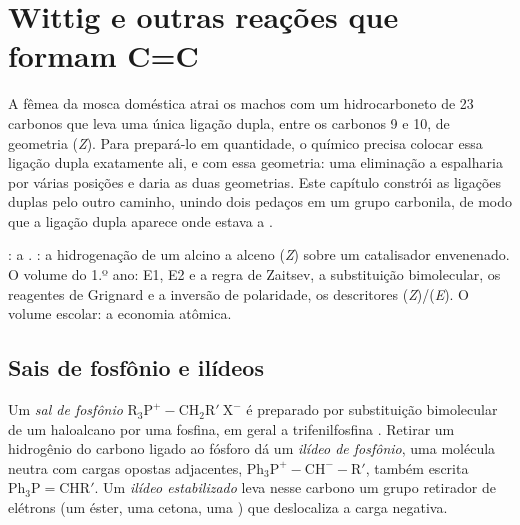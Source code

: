 \chapter{Wittig e outras reações que formam C=C}\label{ch:b2:wittig}

A fêmea da mosca doméstica atrai os machos com um hidrocarboneto de 23 carbonos que leva uma única
ligação dupla, entre os carbonos 9 e 10, de geometria (\textit{Z}). Para prepará-lo em quantidade, o
químico precisa colocar essa ligação dupla exatamente ali, e com essa geometria: uma eliminação a
espalharia por várias posições e daria as duas geometrias. Este capítulo constrói as ligações duplas
pelo outro caminho, unindo dois pedaços em um grupo carbonila, de modo que a ligação dupla aparece
onde estava a .

\begin{recall}
: a . : a hidrogenação de um
alcino a alceno (\textit{Z}) sobre um catalisador envenenado. O volume do 1.º ano: E1, E2 e a regra de
Zaitsev, a substituição bimolecular, os reagentes de Grignard e a inversão de polaridade, os
descritores (\textit{Z})/(\textit{E}). O volume escolar: a economia atômica.
\end{recall}

\section{Sais de fosfônio e ilídeos}

\begin{definition}\label{def:b2:wittig:ylide}
Um \emph{sal de fosfônio} $\mathrm{R_3P^+{-}CH_2R'\ X^-}$ é preparado por substituição
bimolecular de um haloalcano por uma fosfina, em geral a trifenilfosfina . Retirar um
hidrogênio do carbono ligado ao fósforo dá um \emph{ilídeo de fosfônio},
uma molécula neutra com cargas opostas adjacentes, $\mathrm{Ph_3P^+{-}CH^-{-}R'}$, também escrita $\mathrm{Ph_3P{=}CHR'}$. Um
\emph{ilídeo estabilizado} leva nesse carbono um grupo retirador de elétrons
(um éster, uma cetona, uma ) que deslocaliza a carga negativa.
\end{definition}

